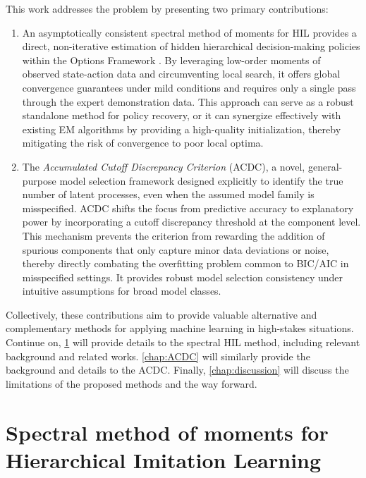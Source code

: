 This work addresses the problem by presenting two primary contributions:
\begin{enumerate}
  \item An asymptotically consistent spectral method of moments for HIL provides a direct, non-iterative estimation of 
    hidden hierarchical decision-making policies within the Options Framework \citep{SUTTON1999181}. 
    By leveraging low-order moments of observed state-action data and circumventing local search, 
    it offers global convergence guarantees under mild conditions and 
    requires only a single pass through the expert demonstration data. 
    This approach can serve as a robust standalone method for policy recovery, 
    or it can synergize effectively with existing EM algorithms by providing a high-quality initialization, 
    thereby mitigating the risk of convergence to poor local optima.
  \item The \emph{Accumulated Cutoff Discrepancy Criterion} (ACDC), a novel, general-purpose model selection framework 
    designed explicitly to identify the true number of latent processes, even when the assumed model family is misspecified. 
    ACDC shifts the focus from predictive accuracy to explanatory power by incorporating a 
    cutoff discrepancy threshold at the component level. This mechanism prevents the criterion from 
    rewarding the addition of spurious components that only capture minor data deviations or noise, 
    thereby directly combating the overfitting problem common to BIC/AIC in misspecified settings. 
    It provides robust model selection consistency under intuitive assumptions for broad model classes.
\end{enumerate}
Collectively, these contributions aim to provide valuable alternative and complementary methods for applying machine learning 
in high-stakes situations. Continue on, \cref{chap:Spectral_HIL} will provide details to 
the spectral HIL method, including relevant background and related works. 
\cref{chap:ACDC} will similarly provide the background and details to the ACDC. 
Finally, \cref{chap:discussion} will discuss the limitations of the proposed methods and the way forward.

 
\chapter{Spectral method of moments for Hierarchical Imitation Learning}\label{chap:Spectral_HIL}
